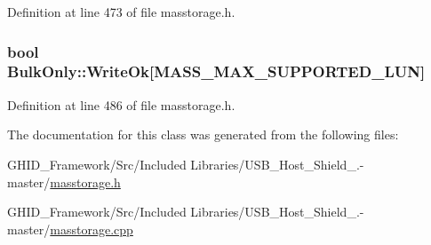 \-Definition at line 473 of file masstorage.\-h.

\hypertarget{class_bulk_only_af763ffffdd131949322d583fb4cd2737}{
\subsubsection[{\-Write\-Ok}]{\setlength{\rightskip}{0pt plus 5cm}bool {\bf \-Bulk\-Only\-::\-Write\-Ok}\mbox{[}\-M\-A\-S\-S\-\_\-\-M\-A\-X\-\_\-\-S\-U\-P\-P\-O\-R\-T\-E\-D\-\_\-\-L\-U\-N\mbox{]}}}\label{class_bulk_only_af763ffffdd131949322d583fb4cd2737}


\-Definition at line 486 of file masstorage.\-h.



\-The documentation for this class was generated from the following files\-:\begin{DoxyCompactItemize}
\item 
\-G\-H\-I\-D\-\_\-\-Framework/\-Src/\-Included Libraries/\-U\-S\-B\-\_\-\-Host\-\_\-\-Shield\-\_.-\/master/\hyperlink{masstorage_8h}{masstorage.\-h}\item 
\-G\-H\-I\-D\-\_\-\-Framework/\-Src/\-Included Libraries/\-U\-S\-B\-\_\-\-Host\-\_\-\-Shield\-\_.-\/master/\hyperlink{masstorage_8cpp}{masstorage.\-cpp}\end{DoxyCompactItemize}

